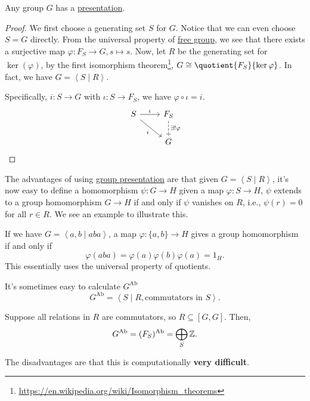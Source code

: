 \begin{theorem}
	Any group \(G\) has a \hyperref[def:group-presentation]{presentation}.
\end{theorem}
\begin{proof}
	We first choose a generating set \(S\) for \(G\). Notice that we can even choose \(S = G\) directly. From the universal property of \hyperref[def:free-group]{free group},
	we see that there exists a surjective map \(\varphi \colon F_S \to G, s \mapsto s\). Now, let \(R\) be the generating set for \(\ker (\varphi) \),
	by the first isomorphism theorem\footnote{\url{https://en.wikipedia.org/wiki/Isomorphism_theorems}}, \(G\cong \quotient{F_S}{\ker  \varphi}\).
	In fact, we have \(G = \left< S \mid R \right> \).

	Specifically, \(i\colon S\to G\) with \(\iota \colon S\to F_S\), we have \(\varphi \circ \iota = i\).
	\[
		\begin{tikzcd}
			S \ar[rd, "i"']\ar[r, "\iota "] & F_S\ar[d, dashed, "\exists !\varphi"]\\
			& G
		\end{tikzcd}
	\]
\end{proof}

\begin{remark}
	The advantages of using \hyperref[def:group-presentation]{group presentation} are that given \(G = \left< S \mid R \right> \), it's now easy to define
	a homomorphism \(\psi \colon G\to H\) given a map \(\varphi \colon S\to H\), \(\psi \) extends to a group homomorphism \(G\to H\) if and only if \(\psi \)
	vanishes on \(R\), i.e., \(\psi (r) = 0\) for all \(r\in R\). We see an example to illustrate this.

	\begin{eg}
		If we have \(G = \left< a, b \mid aba \right> \), a map \(\varphi \colon \{a, b\}\to H\) gives a group homomorphism if and only if
		\[
			\varphi (aba) = \varphi (a)\varphi (b)\varphi (a) = 1_H.
		\]
		This essentially uses the universal property of quotients.
	\end{eg}
\end{remark}

\hr

\begin{remark}
	It's sometimes easy to calculate \(G^{\mathrm{Ab}}\)
	\[
		G^{\mathrm{Ab}} = \left< S \mid R, \text{commutators in \(S\)}\right>.
	\]
	\begin{eg}
		Suppose all relations in \(R\) are commutators, so \(R\subseteq[G, G]\). Then,
		\[
			G^{\mathrm{Ab}} = (F_S)^{\mathrm{Ab}} = \bigoplus_S \mathbb{\MakeUppercase{z}}.
		\]
	\end{eg}
\end{remark}
\begin{remark}
	The disadvantages are that this is computationally \textbf{very difficult}.
\end{remark}
\hr

